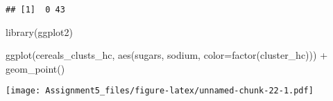 \documentclass[
]{article}
\newenvironment{Shaded}{\begin{snugshade}}{\end{snugshade}}
\newcommand{\AttributeTok}[1]{\textcolor[rgb]{0.77,0.63,0.00}{#1}}
\newcommand{\FunctionTok}[1]{\textcolor[rgb]{0.00,0.00,0.00}{#1}}
\newcommand{\NormalTok}[1]{#1}
\newcommand{\SpecialCharTok}[1]{\textcolor[rgb]{0.00,0.00,0.00}{#1}}
\begin{document}
\begin{verbatim}
## [1]  0 43
\end{verbatim}

\begin{Shaded}
\begin{Highlighting}[]
\FunctionTok{library}\NormalTok{(ggplot2)}

\FunctionTok{ggplot}\NormalTok{(cereals\_clusts\_hc, }\FunctionTok{aes}\NormalTok{(sugars, sodium, }\AttributeTok{color=}\FunctionTok{factor}\NormalTok{(cluster\_hc))) }\SpecialCharTok{+} \FunctionTok{geom\_point}\NormalTok{()}
\end{Highlighting}
\end{Shaded}

\texttt{[image: Assignment5\_files/figure-latex/unnamed-chunk-22-1.pdf]}
\end{document}

